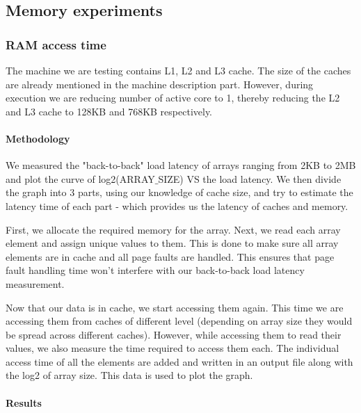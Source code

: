 \documentclass[conference]{IEEEtran}
\begin{document}

\subsection{Memory experiments}


\subsubsection{RAM access time}

The machine we are testing contains L1, L2 and L3 cache. The size of the caches are already mentioned in the machine description part. However, during execution we are reducing number of active core to 1, thereby reducing the L2 and L3 cache to 128KB and 768KB respectively. 


\paragraph{Methodology}

We measured the "back-to-back" load latency of arrays ranging from 2KB to 2MB and plot the curve of log2(ARRAY$\_$SIZE) VS the load latency. We then divide the graph into 3 parts, using our knowledge of cache size, and try to estimate the latency time of each part - which provides us the latency of caches and memory. 
\par First, we allocate the required memory for the array. Next, we read each array element and assign unique values to them. This is done to make sure all array elements are in cache and all page faults are handled. This ensures that page fault handling time won't interfere with our back-to-back load latency measurement.
\par Now that our data is in cache, we start accessing them again. This time we are accessing them from caches of different level (depending on array size they would be spread across different caches). However, while accessing them to read their values, we also measure the time required to access them each. The individual access time of all the elements are added and written in an output file along with the log2 of array size. This data is used to plot the graph.

\paragraph{Results}
\end{document}
